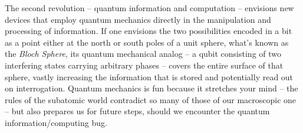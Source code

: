 The second revolution -- quantum information and computation -- envisions new
devices that employ quantum mechanics directly in the manipulation and
processing of information. If one envisions the two possibilities encoded in
a bit as a point either at the north or south poles of a unit sphere, what's
known as the \textit{Bloch Sphere}, its quantum mechanical analog -- a qubit
consisting of two interfering states carrying arbitrary phases -- covers the
entire surface of that sphere, vastly increasing the information that is stored
and potentially read out on interrogation. Quantum mechanics is fun because it
stretches your mind -- the rules of the subatomic world contradict so many of
those of our macroscopic one -- but also prepares us for future steps, should
we encounter the quantum information/computing bug. 
